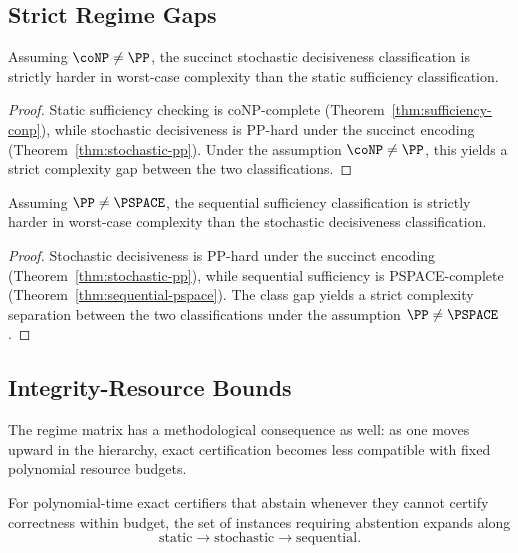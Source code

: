 \subsection{Strict Regime Gaps}

\begin{theorem}\label{thm:static-stochastic-strict}
Assuming $\coNP \ne \PP$, the succinct stochastic decisiveness classification is strictly harder in worst-case complexity than the static sufficiency classification.
\end{theorem}


\begin{proof}
Static sufficiency checking is coNP-complete (Theorem~\ref{thm:sufficiency-conp}), while stochastic decisiveness is PP-hard under the succinct encoding (Theorem~\ref{thm:stochastic-pp}). Under the assumption $\coNP \ne \PP$, this yields a strict complexity gap between the two classifications.
\end{proof}

\begin{theorem}\label{thm:stochastic-sequential-strict}
Assuming $\PP \ne \PSPACE$, the sequential sufficiency classification is strictly harder in worst-case complexity than the stochastic decisiveness classification.
\end{theorem}


\begin{proof}
Stochastic decisiveness is PP-hard under the succinct encoding (Theorem~\ref{thm:stochastic-pp}), while sequential sufficiency is PSPACE-complete (Theorem~\ref{thm:sequential-pspace}). The class gap yields a strict complexity separation between the two classifications under the assumption $\PP \ne \PSPACE$.
\end{proof}

\subsection{Integrity-Resource Bounds}

The regime matrix has a methodological consequence as well: as one moves upward in the hierarchy, exact certification becomes less compatible with fixed polynomial resource budgets.

\begin{proposition}\label{prop:abstention-frontier}
For polynomial-time exact certifiers that abstain whenever they cannot certify correctness within budget, the set of instances requiring abstention expands along
\[
\text{static} \to \text{stochastic} \to \text{sequential}.
\]
\end{proposition}

